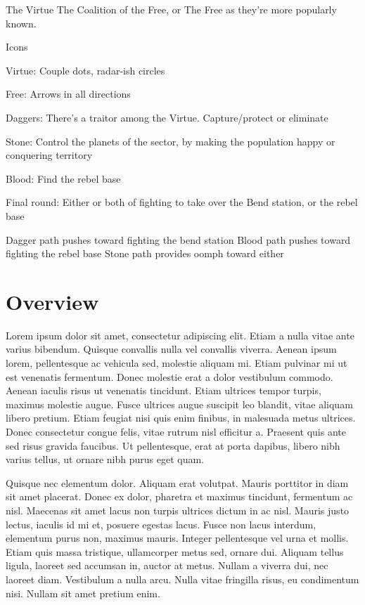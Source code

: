 \documentclass{novanarrative}
\begin{document}
The Virtue
The Coalition of the Free, or The Free as they're more popularly known.

Icons

Virtue: Couple dots, radar-ish circles

Free: Arrows in all directions


Daggers: There's a traitor among the Virtue.  Capture/protect or eliminate

Stone: Control the planets of the sector, by making the population happy or
conquering territory

Blood: Find the rebel base


Final round: Either or both of fighting to take over the Bend station,
or the rebel base

Dagger path pushes toward fighting the bend station
Blood path pushes toward fighting the rebel base
Stone path provides oomph toward either

\section{Overview}

Lorem ipsum dolor sit amet, consectetur adipiscing elit. Etiam a nulla vitae ante varius bibendum. Quisque convallis nulla vel convallis viverra. Aenean ipsum lorem, pellentesque ac vehicula sed, molestie aliquam mi. Etiam pulvinar mi ut est venenatis fermentum. Donec molestie erat a dolor vestibulum commodo. Aenean iaculis risus ut venenatis tincidunt. Etiam ultrices tempor turpis, maximus molestie augue. Fusce ultrices augue suscipit leo blandit, vitae aliquam libero pretium. Etiam feugiat nisi quis enim finibus, in malesuada metus ultrices. Donec consectetur congue felis, vitae rutrum nisl efficitur a. Praesent quis ante sed risus gravida faucibus. Ut pellentesque, erat at porta dapibus, libero nibh varius tellus, ut ornare nibh purus eget quam.

Quisque nec elementum dolor. Aliquam erat volutpat. Mauris porttitor in diam sit amet placerat. Donec ex dolor, pharetra et maximus tincidunt, fermentum ac nisl. Maecenas sit amet lacus non turpis ultrices dictum in ac nisl. Mauris justo lectus, iaculis id mi et, posuere egestas lacus. Fusce non lacus interdum, elementum purus non, maximus mauris. Integer pellentesque vel urna et mollis. Etiam quis massa tristique, ullamcorper metus sed, ornare dui. Aliquam tellus ligula, laoreet sed accumsan in, auctor at metus. Nullam a viverra dui, nec laoreet diam. Vestibulum a nulla arcu. Nulla vitae fringilla risus, eu condimentum nisi. Nullam sit amet pretium enim.
\end{document}
